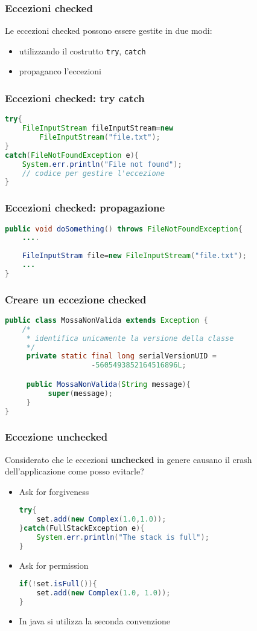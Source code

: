 \documentclass{beamer}
\begin{document}
\begin{frame}[fragile]
\frametitle{Eccezioni checked}
Le eccezioni checked possono essere gestite in due modi:
\begin{itemize}
\item utilizzando il costrutto \texttt{try}, \texttt{catch}
\item propaganco l'eccezioni
\end{itemize}
\end{frame}

\begin{frame}[fragile]
\frametitle{Eccezioni checked: try catch}
\begin{lstlisting}[language=Java]
try{
    FileInputStream fileInputStream=new 
        FileInputStream("file.txt");        
}
catch(FileNotFoundException e){
    System.err.println("File not found");
    // codice per gestire l'eccezione
}
\end{lstlisting}
\end{frame}


\begin{frame}[fragile]
\frametitle{Eccezioni checked: propagazione}
\begin{lstlisting}[language=Java]
public void doSomething() throws FileNotFoundException{
    ....
    
    FileInputStram file=new FileInputStream("file.txt");
    ...
}
\end{lstlisting}
\end{frame}

\begin{frame}[fragile]
\frametitle{Creare un eccezione checked}
\begin{lstlisting}[language=Java]
public class MossaNonValida extends Exception {
    /*
     * identifica unicamente la versione della classe 
     */
     private static final long serialVersionUID = 
	                -5605493852164516896L;

     public MossaNonValida(String message){
          super(message);
     }
}
\end{lstlisting}
\end{frame}

\begin{frame}[fragile]
\frametitle{Eccezione unchecked}
Considerato che le eccezioni \textbf{unchecked} in genere causano il crash dell'applicazione come posso evitarle?
\begin{itemize}
\item Ask for forgiveness
\begin{lstlisting}[language=Java]
try{
    set.add(new Complex(1.0,1.0));
}catch(FullStackException e){
    System.err.println("The stack is full");
}
\end{lstlisting}
\item Ask for permission
\begin{lstlisting}[language=Java]
if(!set.isFull()){
    set.add(new Complex(1.0, 1.0));
}
\end{lstlisting}
\item In java si utilizza la seconda convenzione
\end{itemize}
\end{frame}
\end{document}
